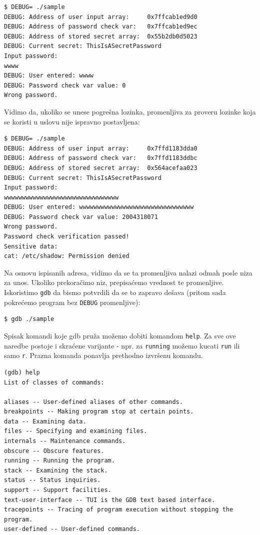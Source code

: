 \begin{verbatim}
$ DEBUG= ./sample
DEBUG: Address of user input array:     0x7ffcab1ed9d0
DEBUG: Address of password check var:   0x7ffcab1ed9ec
DEBUG: Address of stored secret array:  0x55b2db0d5023
DEBUG: Current secret: ThisIsASecretPassword
Input password:
wwww
DEBUG: User entered: wwww
DEBUG: Password check var value: 0
Wrong password.
\end{verbatim}

Vidimo da, ukoliko se unese pogrešna lozinka, promenljiva za proveru lozinke koja se koristi u uslovu nije ispravno postavljena:

\begin{verbatim}
$ DEBUG= ./sample
DEBUG: Address of user input array:     0x7ffd1183dda0
DEBUG: Address of password check var:   0x7ffd1183ddbc
DEBUG: Address of stored secret array:  0x564acefaa023
DEBUG: Current secret: ThisIsASecretPassword
Input password:
wwwwwwwwwwwwwwwwwwwwwwwwwwwwwwww
DEBUG: User entered: wwwwwwwwwwwwwwwwwwwwwwwwwwwwwwww
DEBUG: Password check var value: 2004318071
Wrong password.
Password check verification passed!
Sensitive data:
cat: /etc/shadow: Permission denied
\end{verbatim}

Na osnovu ispisanih adresa, vidimo da se ta promenljiva nalazi odmah posle niza za unos. Ukoliko prekoračimo niz, prepisaćemo vrednost te promenljive. Iskoristimo \texttt{gdb} da bismo potvrdili da se to zapravo dešava (pritom sada pokrećemo program bez \texttt{DEBUG} promenljive):

\begin{verbatim}
$ gdb ./sample
\end{verbatim}

Spisak komandi koje gdb pruža možemo dobiti komandom \texttt{help}. Za sve ove naredbe postoje i skraćene varijante - npr. za \texttt{running} možemo kucati \texttt{run} ili samo \texttt{r}. Prazna komanda ponavlja prethodno izvršenu komandu.

\begin{verbatim}
(gdb) help
List of classes of commands:

aliases -- User-defined aliases of other commands.
breakpoints -- Making program stop at certain points.
data -- Examining data.
files -- Specifying and examining files.
internals -- Maintenance commands.
obscure -- Obscure features.
running -- Running the program.
stack -- Examining the stack.
status -- Status inquiries.
support -- Support facilities.
text-user-interface -- TUI is the GDB text based interface.
tracepoints -- Tracing of program execution without stopping the program.
user-defined -- User-defined commands.
\end{verbatim}


